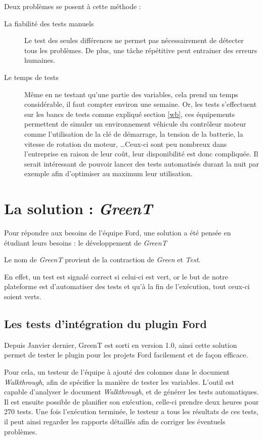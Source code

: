 	\vspace{20px}
	Deux problèmes se posent à cette méthode : 
	\begin{description}
		\item[La fiabilité des tests manuels] Le test des seules différences ne permet pas nécessairement de détecter tous les problèmes. De plus, une tâche répétitive peut entrainer des erreurs humaines.
		\item[Le temps de tests] Même en ne testant qu'une partie des variables, cela prend un temps considérable, il faut compter environ une semaine.\newline
			Or, les tests s'effectuent sur les bancs de tests comme expliqué section \ref{wb}, ces équipements permettent de simuler un environnement véhicule du contrôleur moteur comme
			l'utilisation de la clé de démarrage, la tension de la batterie, la vitesse de rotation du moteur, \ldots Ceux-ci sont peu
			nombreux dans l'entreprise en raison de leur coût, leur disponibilité est donc compliquée. Il serait intéressant de pouvoir lancer
			des tests automatisés durant la nuit par exemple afin d'optimiser au maximum leur utilisation.
	\end{description}
	
\newpage
	\section{La solution : \textit{GreenT}}
	Pour répondre aux besoins de l'équipe Ford, une solution a été pensée en étudiant leurs besoins : le développement de \textit{GreenT}
	\begin{remarque}
		Le nom de \textit{GreenT} provient de la contraction de \textit{Green} et \textit{Test}.
		
		En effet, un test est signalé correct si celui-ci est vert, or le but de notre plateforme est d'automatiser des tests et qu'à la fin de l'exécution, tout ceux-ci soient verts.
	\end{remarque}
	
	\subsection{Les tests d'intégration du plugin Ford}
		Depuis Janvier dernier, GreenT est sorti en version 1.0, ainsi cette solution permet de tester le plugin pour les projets Ford facilement et de façon efficace.
		
		 Pour cela, un testeur de l'équipe à ajouté des colonnes dans le document \textit{Walkthrough}, afin de spécifier la manière de tester les variables. L'outil est capable d'analyser le document \textit{Walkthrough}, et de générer les tests automatiques. Il est ensuite possible de planifier son exécution, celle-ci prendre deux heures pour 270 tests. Une fois l'exécution terminée, le testeur a tous les résultats de ces tests, il peut ainsi regarder les rapports détaillés afin de corriger les éventuels problèmes.
	
